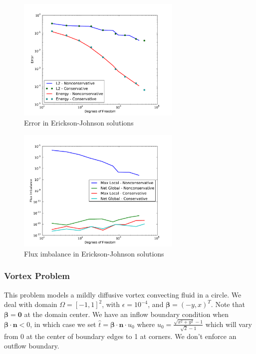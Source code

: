 \documentclass[letterpaper]{article}
\def\bbeta{\boldsymbol\beta}
\begin{document}
\begin{figure}[p]
\centering
\includegraphics[width=0.7\textwidth]{figs/Erickson/modifiedError.pdf}
\caption{Error in Erickson-Johnson solutions}
\label{fig:ericksonError}
\end{figure}

\begin{figure}[h!]
\centering
\includegraphics[width=0.7\textwidth]{figs/Erickson/modifiedFlux.pdf}
\caption{Flux imbalance in Erickson-Johnson solutions}
\label{ericksonFlux}
\end{figure}

\subsubsection{Vortex Problem}
This problem models a mildly diffusive vortex convecting fluid in a circle. We
deal with domain $\Omega=[-1,1]^2$, with $\epsilon=10^{-4}$, and
$\bbeta=(-y,x)^T$. Note that $\bbeta=\mathbf{0}$ at the domain center. We have an
inflow boundary condition when $\bbeta\cdot\mathbf{n}<0$, in which case we set
$\hat t=\bbeta\cdot\mathbf{n}\cdot u_0$ where
$u_0=\frac{\sqrt{x^2+y^2}-1}{\sqrt{2}-1}$ which will vary from 0 at the center
of boundary edges to 1 at corners. We don't enforce an outflow boundary.
\end{document}
